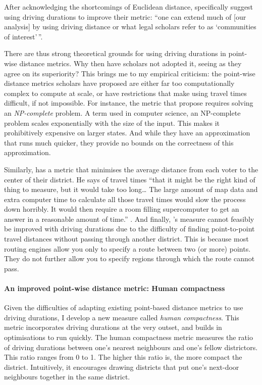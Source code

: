 \documentclass[]{article}
\let\oldparagraph\paragraph
\renewcommand{\paragraph}[1]{\oldparagraph{#1}\mbox{}}
\begin{document}
After acknowledging the shortcomings of Euclidean distance,
\citeauthor{fh2011} specifically suggest using driving durations to
improve their metric: ``one can extend much of {[}our analysis{]} by
using driving distance or what legal scholars refer to as `communities
of interest'\,''.

There are thus strong theoretical grounds for using driving durations in
point-wise distance metrics. Why then have scholars not adopted it,
seeing as they agree on its superiority? This brings me to my empirical
criticism: the point-wise distance metrics scholars have proposed are
either far too computationally complex to compute at scale, or have
restrictions that make using travel times difficult, if not impossible.
For instance, the metric that \citet{fh2011} propose requires solving an
\emph{NP-complete} problem. A term used in computer science, an
NP-complete problem scales exponentially with the size of the input.
This makes it prohibitively expensive on larger states. And while they
have an approximation that runs much quicker, they provide no bounds on
the correctness of this approximation.

Similarly, \citeauthor{olson2010} has a metric that minimises the
average distance from each voter to the center of their district. He
says of travel times ``that it might be the right kind of thing to
measure, but it would take too long\ldots{} The large amount of map data
and extra computer time to calculate all those travel times would slow
the process down horribly. It would then require a room filling
supercomputer to get an answer in a reasonable amount of time.''
\citep{olson2010}. And finally, \citeauthor{cm2010}'s measure cannot
feasibly be improved with driving durations due to the difficulty of
finding point-to-point travel distances without passing through another
district. This is because most routing engines allow you only to specify
a route between two (or more) points. They do not further allow you to
specify regions through which the route cannot pass.

\hypertarget{an-improved-point-wise-distance-metric-human-compactness}{%
\paragraph{An improved point-wise distance metric: Human
compactness}\label{an-improved-point-wise-distance-metric-human-compactness}}

Given the difficulties of adapting existing point-based distance metrics
to use driving durations, I develop a new measure called \emph{human
compactness}. This metric incorporates driving durations at the very
outset, and builds in optimisations to run quickly. The human
compactness metric measures the ratio of driving durations between one's
nearest neighbours and one's fellow districtors. This ratio ranges from
0 to 1. The higher this ratio is, the more compact the district.
Intuitively, it encourages drawing districts that put one's next-door
neighbours together in the same district.
\end{document}
